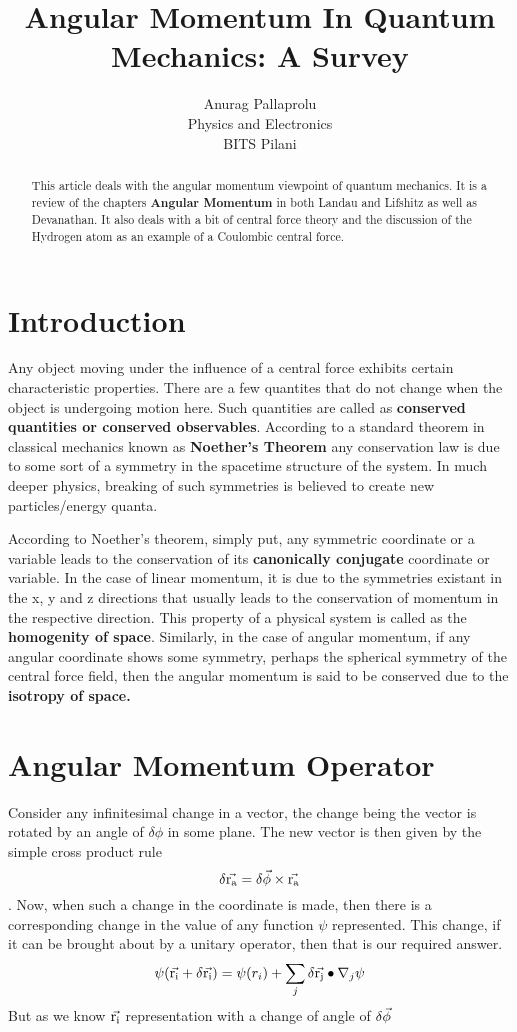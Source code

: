 \documentclass[12pt]{article}
\begin{document}
\title{Angular Momentum In Quantum Mechanics: A Survey}
\author{Anurag Pallaprolu \\Physics and Electronics\\ BITS Pilani}
\maketitle
\begin{abstract}
This article deals with the angular momentum viewpoint of quantum mechanics. It is a review of the chapters \textbf{Angular Momentum} in both Landau and Lifshitz as well as Devanathan. It also deals with a bit of central force theory and the discussion of the Hydrogen atom as an example of a Coulombic central force.
\end{abstract}
\section*{Introduction}
Any object moving under the influence of a central force exhibits certain characteristic properties. There are a few quantites that do not change when the object is undergoing motion here. Such quantities are called as \textbf{conserved quantities or conserved observables}. According to a standard theorem in classical mechanics known as \textbf{Noether's Theorem} any conservation law is due to some sort of a symmetry in the spacetime structure of the system. In much deeper physics, breaking of such symmetries is believed to create new particles/energy quanta. 

According to Noether's theorem, simply put, any symmetric coordinate or a variable leads to the conservation of its \textbf{canonically conjugate} coordinate or variable. In the case of linear momentum, it is due to the symmetries existant in the x, y and z directions that usually leads to the conservation of momentum in the respective direction. This property of a physical system is called as the \textbf{homogenity of space}. Similarly, in the case of angular momentum, if any angular coordinate shows some symmetry, perhaps the spherical symmetry of the central force field, then the angular momentum is said to be conserved due to the \textbf{isotropy of space.}
\section{Angular Momentum Operator}
Consider any infinitesimal change in a vector, the change being the vector is rotated by an angle of $\delta\phi$ in some plane. The new vector is then given by the simple cross product rule $$\delta\vec{\mathrm{r_{a}}} = {\delta\vec{\mathrm{\phi}}}\times{\ensuremath{\vec{\mathrm{r_{a}}}}}$$. Now, when such a change in the coordinate is made, then there is a corresponding change in the value of any function $\psi$ represented. This change, if it can be brought about by a unitary operator, then that is our required answer. $$\psi (\vec{\mathrm{r_{i}}}+\delta\vec{\mathrm{r_{i}}}) = \psi(r_{i}) + \sum_j \delta{\ensuremath{\vec{\mathrm{r_{j}}}}}\bullet{\ensuremath{\nabla}_{j}\psi}$$
But as we know $\vec{\mathrm{r_{i}}}$ representation with a change of angle of $\delta\vec{\mathrm{\phi}}$
\end{document}
